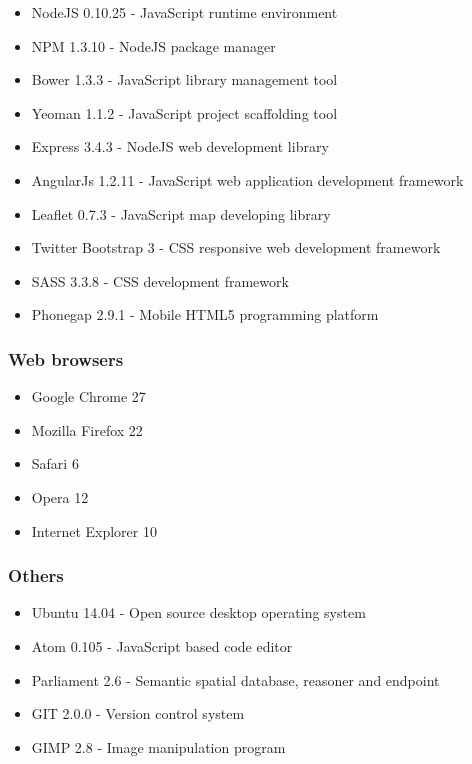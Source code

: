 \begin{itemize}
\item NodeJS 0.10.25 - JavaScript runtime environment
\item NPM 1.3.10 - NodeJS package manager
\item Bower 1.3.3 - JavaScript library management tool
\item Yeoman 1.1.2 - JavaScript project scaffolding tool
\item Express 3.4.3 - NodeJS web development library
\item AngularJs 1.2.11 - JavaScript web application development framework
\item Leaflet 0.7.3 - JavaScript map developing library
\item Twitter Bootstrap 3 - CSS responsive web development framework
\item SASS 3.3.8 - CSS development framework
\item Phonegap 2.9.1 - Mobile HTML5 programming platform
\end{itemize}

\subsubsection*{Web browsers}

\begin{itemize}
\item Google Chrome 27 
\item Mozilla Firefox 22
\item Safari 6
\item Opera 12
\item Internet Explorer 10
\end{itemize}

\subsubsection*{Others}

\begin{itemize}
\item Ubuntu 14.04 - Open source desktop operating system
\item Atom 0.105 - JavaScript based code editor
\item Parliament 2.6 - Semantic spatial database, reasoner and endpoint
\item GIT 2.0.0 - Version control system
\item GIMP 2.8 - Image manipulation program
\end{itemize}

